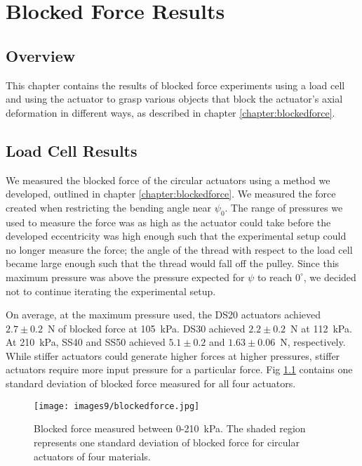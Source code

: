 \chapter{Blocked Force Results}

\section*{Overview}

This chapter contains the results of blocked force experiments using a load cell and using the actuator to grasp various objects that block the actuator's axial deformation in different ways, as described in chapter \ref{chapter:blockedforce}. 

\section{Load Cell Results}

We measured the blocked force of the circular actuators using a method we developed, outlined in chapter \ref{chapter:blockedforce}. We measured the force created when restricting the bending angle near $\psi_0$. The range of pressures we used to measure the force was as high as the actuator could take before the developed eccentricity was high enough such that the experimental setup could no longer measure the force; the angle of the thread with respect to the load cell became large enough such that the thread would fall off the pulley. Since this maximum pressure was above the pressure expected for $\psi$ to reach $0^\circ$, we decided not to continue iterating the experimental setup. 

On average, at the maximum pressure used, the DS20 actuators achieved $2.7\pm0.2$~N of blocked force at 105~kPa. DS30 achieved $2.2\pm0.2$~N at 112~kPa. At 210~kPa, SS40 and SS50 achieved $5.1\pm0.2$ and $1.63\pm0.06$~N, respectively. While stiffer actuators could generate higher forces at higher pressures, stiffer actuators require more input pressure for a particular force. Fig \ref{fig:blockedforce} contains one standard deviation of blocked force measured for all four actuators. 

\begin{figure}[!ht]
    \centering
     \texttt{[image: images9/blockedforce.jpg]}
    \caption{Blocked force measured between 0-210~kPa. The shaded region represents one standard deviation of blocked force for circular actuators of four materials.}
    \label{fig:blockedforce}
\end{figure}

